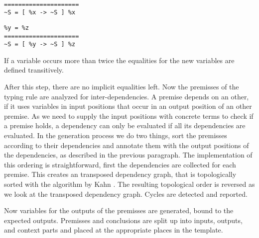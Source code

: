 \begin{example}{~}
\newline
  \begin{minipage}[b]{.45\linewidth}
    \begin{verbatim}
=====================
~S = [ %x -> ~S ] %x
\end{verbatim}
  \end{minipage}
  \begin{minipage}[b]{.45\linewidth}
    \begin{verbatim}
%y = %z
=====================
~S = [ %y -> ~S ] %z
\end{verbatim}
  \end{minipage}
\label{ex:implicit-equalities}
\end{example}

If a variable occurs more than twice the equalities for the new
variables are defined transitively.


After this step, there are no implicit equalities left. Now the
premisses of the typing rule are analyzed for inter-dependencies. A
premise depends on an other, if it uses variables in input positions
that occur in an output position of an other premise. As we need to
supply the input positions with concrete terms to check if a premise
holds, a dependency can only be evaluated if all its dependencies are
evaluated. In the generation process we do two things, sort the
premisses according to their dependencies and annotate them with the
output positions of the dependencies, as described in the previous
paragraph. The implementation of this ordering is straightforward,
first the dependencies are collected for each premise. This creates an
transposed dependency graph, that is topologically sorted with the
algorithm by Kahn \cite{Kahn:1962:TSL:368996.369025}. The resulting
topological order is reversed as we look at the transposed dependency
graph. Cycles are detected and reported.

Now variables for the outputs of the premisses are generated, bound to
the expected outputs. Premisses and conclusions are split up into
inputs, outputs, and context parts and placed at the appropriate
places in the template.


